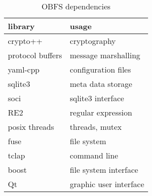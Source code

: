 \documentclass[10pt,twocolumn]{article}
\begin{document}
\begin{table}[ht]
    \centering
    \begin{tabular}{l|l}
      \textbf{library} & \textbf{usage} \\ \hline
      crypto++          & cryptography        \\
      protocol buffers  & message marshalling \\
      yaml-cpp          & configuration files \\
      sqlite3           & meta data storage   \\
      soci              & sqlite3 interface   \\
      RE2               & regular expression  \\
      posix threads     & threads, mutex      \\
      fuse              & file system         \\
      tclap             & command line        \\
      boost             & file system interface\\ 
     Qt		    & graphic user interface
    \end{tabular}
    \caption{OBFS dependencies}
    \label{tbl:dependencies}
\end{table}
\end{document}
